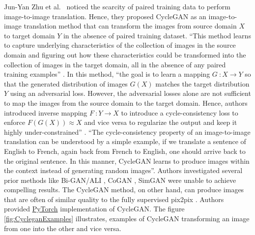 Jun-Yan Zhu et al.\ \cite{zhu2020unpaired} noticed the scarcity of 	paired training data to perform image-to-image translation. Hence, they proposed \ac{CycleGAN} as an image-to-image translation method that can transform the images from source domain $X$ to target domain $Y$ in the absence of paired training dataset. ``This method learns to capture underlying characteristics of the collection of images in the source domain and figuring out how these characteristics could be transformed into the collection of images in the target domain, all in the absence of any paired training examples'' \cite{zhu2020unpaired}. In this method, ``the goal is to learn a mapping $G\ \colon X \rightarrow Y$ so that the generated distribution of images $G(X)$ matches the target distribution $Y$ using an adversarial loss. However, the adversarial losses alone are not sufficient to map the images from the source domain to the target domain. Hence, authors introduced inverse mapping $F\ \colon Y \rightarrow X$ to introduce a cycle-consistency loss to enforce $F(G(X))\approx X$ and vice versa to regularize the output and keep it highly under-constrained'' \cite{zhu2020unpaired}. ``The cycle-consistency property of an image-to-image translation can be understood by a simple example, if we translate a sentence of English to French, again back from French to English, one should arrive back to the original sentence. In this manner, \ac{CycleGAN} learns to produce images within the context instead of generating random images''\footnotemark. Authors investigated several prior methods like Bi-GAN/ALI \cite{donahue2017adversarial} \cite{dumoulin2017adversarially}, CoGAN \cite{liu2016coupled}, SimGAN \cite{shrivastava2017learning} were unable to achieve compelling results. The \ac{CycleGAN} method, on other hand, can produce images that are often of similar quality to the fully supervised pix2pix \cite{isola2018imagetoimage}. Authors provided \href{https://github.com/junyanz/pytorch-CycleGAN-and-pix2pix}{PyTorch} implementation of \ac{CycleGAN}. The figure \ref{fig:CycleganExamples} illustrates, examples of \ac{CycleGAN} transforming an image from one into the other and vice versa.


